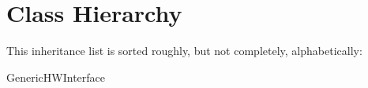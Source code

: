 \section{Class Hierarchy}
This inheritance list is sorted roughly, but not completely, alphabetically\+:\begin{DoxyCompactList}
\item Generic\+H\+W\+Interface\begin{DoxyCompactList}
\item {}
\end{DoxyCompactList}
\item {}
\item {}
\end{DoxyCompactList}
